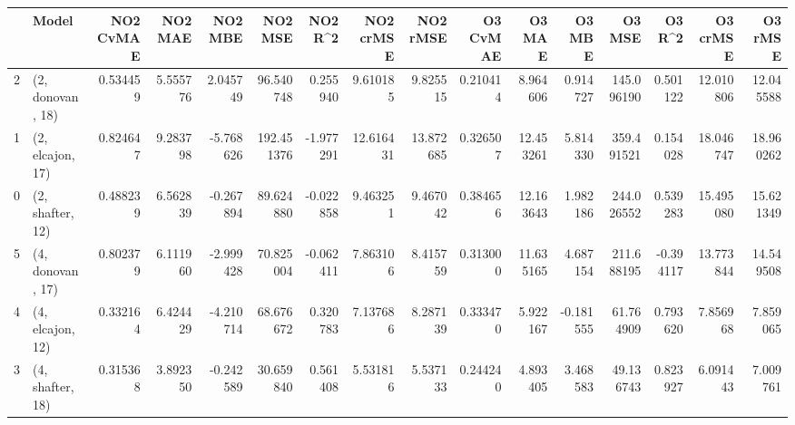 \begin{tabular}{llrrrrrrrrrrrrrr}
\toprule
{} &             Model &  NO2 CvMAE &   NO2 MAE &   NO2 MBE &     NO2 MSE &   NO2 R\textasciicircum2 &  NO2 crMSE &   NO2 rMSE &  O3 CvMAE &     O3 MAE &    O3 MBE &      O3 MSE &    O3 R\textasciicircum2 &   O3 crMSE &    O3 rMSE \\
\midrule
2 &  (2, donovan, 18) &   0.534459 &  5.555776 &  2.045749 &   96.540748 &  0.255940 &   9.610185 &   9.825515 &  0.210414 &   8.964606 &  0.914727 &  145.096190 &  0.501122 &  12.010806 &  12.045588 \\
1 &  (2, elcajon, 17) &   0.824647 &  9.283798 & -5.768626 &  192.451376 & -1.977291 &  12.616431 &  13.872685 &  0.326507 &  12.453261 &  5.814330 &  359.491521 &  0.154028 &  18.046747 &  18.960262 \\
0 &  (2, shafter, 12) &   0.488239 &  6.562839 & -0.267894 &   89.624880 & -0.022858 &   9.463251 &   9.467042 &  0.384656 &  12.163643 &  1.982186 &  244.026552 &  0.539283 &  15.495080 &  15.621349 \\
5 &  (4, donovan, 17) &   0.802379 &  6.111960 & -2.999428 &   70.825004 & -0.062411 &   7.863106 &   8.415759 &  0.313000 &  11.635165 &  4.687154 &  211.688195 & -0.394117 &  13.773844 &  14.549508 \\
4 &  (4, elcajon, 12) &   0.332164 &  6.424429 & -4.210714 &   68.676672 &  0.320783 &   7.137686 &   8.287139 &  0.333470 &   5.922167 & -0.181555 &   61.764909 &  0.793620 &   7.856968 &   7.859065 \\
3 &  (4, shafter, 18) &   0.315368 &  3.892350 & -0.242589 &   30.659840 &  0.561408 &   5.531816 &   5.537133 &  0.244240 &   4.893405 &  3.468583 &   49.136743 &  0.823927 &   6.091443 &   7.009761 \\
\bottomrule
\end{tabular}
